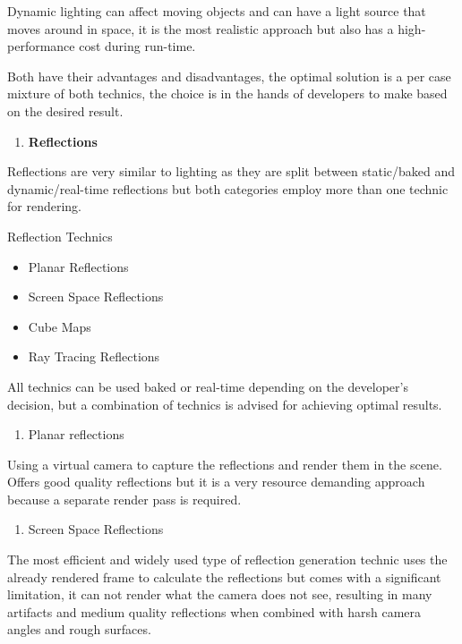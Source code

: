 \documentclass[a4paper,one side,12pt]{book}
\begin{document}
Dynamic lighting can affect moving objects and can have a light source
that moves around in space, it is the most realistic approach but also
has a high-performance cost during run-time.

Both have their advantages and disadvantages, the optimal solution is a
per case mixture of both technics, the choice is in the hands of
developers to make based on the desired result.

\begin{enumerate}
\def\labelenumi{\arabic{enumi}.}
\setcounter{enumi}{1}
\item
  \textbf{Reflections}
\end{enumerate}

Reflections are very similar to lighting as they are split between
static/baked and dynamic/real-time reflections but both categories
employ more than one technic for rendering.

Reflection Technics

\begin{itemize}
\item
  Planar Reflections
\item
  Screen Space Reflections
\item
  Cube Maps
\item
  Ray Tracing Reflections
\end{itemize}

All technics can be used baked or real-time depending on the developer's
decision, but a combination of technics is advised for achieving optimal
results.

\begin{enumerate}
\def\labelenumi{\alph{enumi})}
\item
  Planar reflections
\end{enumerate}

Using a virtual camera to capture the reflections and render them in the
scene. Offers good quality reflections but it is a very resource
demanding approach because a separate render pass is required.

\begin{enumerate}
\def\labelenumi{\alph{enumi})}
\setcounter{enumi}{1}
\item
  Screen Space Reflections
\end{enumerate}

The most efficient and widely used type of reflection generation technic
uses the already rendered frame to calculate the reflections but comes
with a significant limitation, it can not render what the camera does
not see, resulting in many artifacts and medium quality reflections when
combined with harsh camera angles and rough surfaces.
\end{document}
